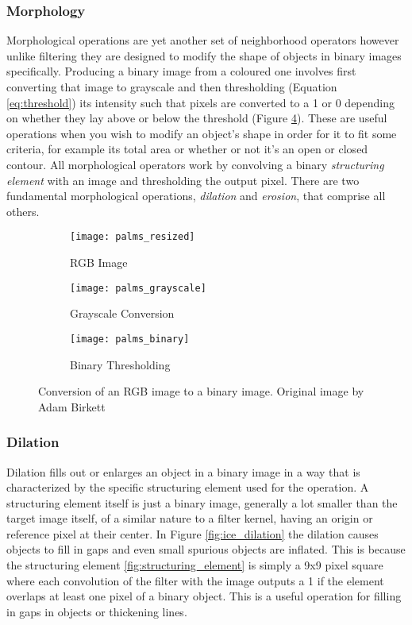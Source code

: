 \subsubsection{Morphology}
\label{subsubsection:morphology}
Morphological operations are yet another set of neighborhood operators however unlike filtering they are designed to modify the shape of objects in binary images specifically. Producing a binary image from a coloured one involves first converting that image to grayscale and then thresholding (Equation \ref{eq:threshold}) its intensity such that pixels are converted to a 1 or 0 depending on whether they lay above or below the threshold (Figure \ref{fig:thresholding}). These are useful operations when you wish to modify an object's shape in order for it to fit some criteria, for example its total area or whether or not it's an open or closed contour. All morphological operators work by convolving a binary \emph{structuring element} with an image and thresholding the output pixel. There are two fundamental morphological operations, \emph{dilation} and \emph{erosion}, that comprise all others. 

\begin{figure}[htbp]
    \centering
    \begin{subfigure}[b]{0.3\textwidth}
        \texttt{[image: palms\_resized]}
        \caption{RGB Image}
        \label{fig:emu_noise}
    \end{subfigure}
    \begin{subfigure}[b]{0.3\textwidth}
        \texttt{[image: palms\_grayscale]}
        \caption{Grayscale Conversion}
        \label{fig:emu_gauss}
    \end{subfigure}
    \begin{subfigure}[b]{0.3\textwidth}
        \texttt{[image: palms\_binary]}
        \caption{Binary Thresholding}
        \label{fig:emu_median}
    \end{subfigure}
    \captionsetup{format = hang}
    \caption{Conversion of an RGB image to a binary image. Original image by Adam Birkett}
    \label{fig:thresholding}
\end{figure}



\subsubsection{Dilation}

Dilation fills out or enlarges an object in a binary image in a way that is characterized by the specific structuring element used for the operation. A structuring element itself is just a binary image, generally a lot smaller than the target image itself, of a similar nature to a filter kernel, having an origin or reference pixel at their center. In Figure \ref{fig:ice_dilation} the dilation causes objects to fill in gaps and even small spurious objects are inflated. This is because the structuring element \ref{fig:structuring_element} is simply a 9x9 pixel square where each convolution of the filter with the image outputs a 1 if the element overlaps at least one pixel of a binary object. This is a useful operation for filling in gaps in objects or thickening lines.


